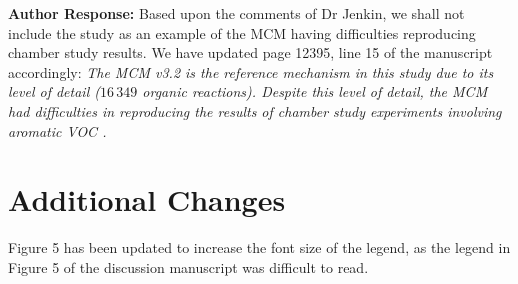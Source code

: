\documentclass{article}
\begin{document}
\textbf{Author Response:} Based upon the comments of Dr Jenkin, we shall not include the \citet{Pinho:2005} study as an example of the MCM having difficulties reproducing chamber study results.
We have updated page 12395, line 15 of the manuscript accordingly: \textit{The MCM v3.2 is the reference mechanism in this study due to its level of detail ($16\,349$ organic reactions). Despite this level of detail, the MCM had difficulties in reproducing the results of chamber study experiments involving aromatic VOC \citep{Bloss:2005}.}

\section*{Additional Changes}

Figure 5 has been updated to increase the font size of the legend, as the legend in Figure 5 of the discussion manuscript was difficult to read.
\end{document}
